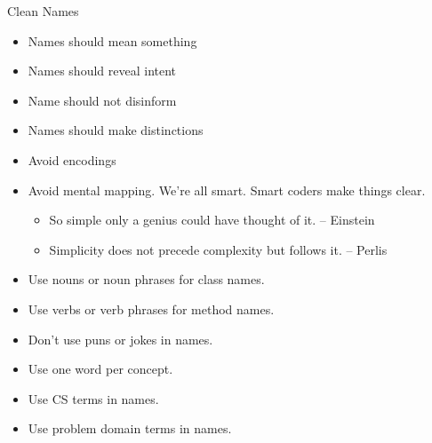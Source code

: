 \documentclass{beamer}
\begin{document}
\begin{frame}[fragile]{Clean Names}



\begin{itemize}
\item Names should mean something
\item Names should reveal intent
\item Name should not disinform
\item Names should make distinctions
\item Avoid encodings
\item Avoid mental mapping. We're all smart.  Smart coders make things clear.
\begin{itemize}
\item So simple only a genius could have thought of it. -- Einstein
\item Simplicity does not precede complexity but follows it. -- Perlis
\end{itemize}
\item Use nouns or noun phrases for class names.
\item Use verbs or verb phrases for method names.
\item Don't use puns or jokes in names.
\item Use one word per concept.
\item Use CS terms in names.
\item Use problem domain terms in names.
\end{itemize}


\end{frame}
\end{document}
